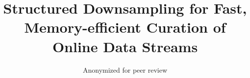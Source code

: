 \title{ Structured Downsampling for Fast, Memory-efficient Curation of Online Data Streams }

\author[]{Anonymized for peer review}

\maketitle

